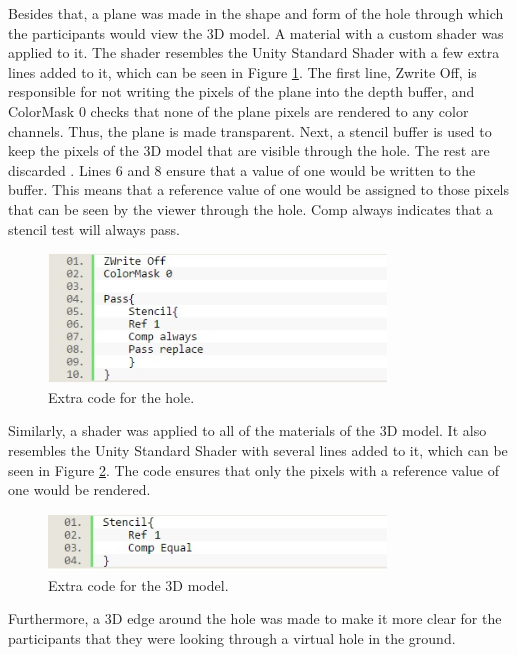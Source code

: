 Besides that, a plane was made in the shape and form of the hole through which the participants would view the 3D model. A material with a custom shader was applied to it. The shader resembles the Unity Standard Shader \cite{unity_standard_shader} with  a few extra lines added to it, which can be seen in Figure \ref{fig:imp4}. The first line, Zwrite Off, is responsible for not writing the pixels of the plane into the depth buffer, and ColorMask 0 checks that none of the plane pixels are rendered to any color channels. Thus, the plane is made transparent. Next, a stencil buffer is used to keep the pixels of the 3D model that are visible through the hole. The rest are discarded \cite{stencil_buffer}. Lines 6 and 8 ensure that a value of one would be written to the buffer. This means that a reference value of one would be assigned to those pixels that can be seen by the viewer through the hole. Comp always indicates that a stencil test will always pass. 

\begin{figure}[h!]
    \centering
    \includegraphics[width=0.8\textwidth]{figures/imp4.jpg}
    \caption{Extra code for the hole.}\label{fig:imp4}
\end{figure}

Similarly, a shader was applied to all of the materials of the 3D model. It also resembles the Unity Standard Shader with several lines added to it, which can be seen in Figure \ref{fig:imp5}. The code ensures that only the pixels with a reference value of one would be rendered.

\begin{figure}[h!]
    \centering
    \includegraphics[width=0.8\textwidth]{figures/imp5.jpg}
    \caption{Extra code for the 3D model.}\label{fig:imp5}
\end{figure}

Furthermore, a 3D edge around the hole was made to make it more clear for the participants that they were looking through a virtual hole in the ground.

